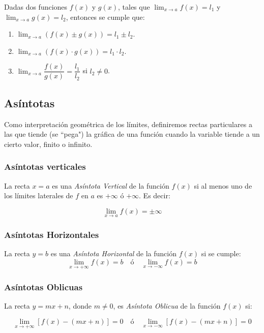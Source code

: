 Dadas dos funciones $f(x)$ y $g(x)$, tales que $\lim_{x\rightarrow
a}f(x)=l_1$ y $\lim_{x\rightarrow a}g(x)=l_2$, entonces se cumple
que:
\begin{enumerate}
\item $\displaystyle \lim_{x\rightarrow a}(f(x)\pm g(x))=l_1\pm l_2$.
\item $\displaystyle \lim_{x\rightarrow a}(f(x)\cdot g(x))=l_1\cdot l_2$.
\item $\displaystyle \lim_{x\rightarrow a}\dfrac{f(x)}{g(x)}=\dfrac{l_1}{l_2}$ si $l_2\neq 0$.
\end{enumerate}

\subsection{Asíntotas}
Como interpretación geométrica de los límites, definiremos rectas
particulares a las que tiende (se ``pega") la gráfica de una función
cuando la variable tiende a un cierto valor, finito o infinito.
\subsubsection*{Asíntotas verticales}
La recta $x=a$ es una \emph{Asíntota Vertical} de la función $f(x)$
si al menos uno de los límites laterales de $f$ en $a$ es $+\infty$
ó $+\infty$. Es decir:

\[
\mathop {\lim }\limits_{x \to a} f(x) =  \pm \infty
\]

\subsubsection*{Asíntotas Horizontales}
La recta $y=b$ es una \emph{Asíntota Horizontal} de la función
$f(x)$ si se cumple:
\[
\mathop {\lim }\limits_{x \to  + \infty } f(x) = b\quad
\text{ó}\quad\mathop {\lim }\limits_{x \to  - \infty } f(x) = b
\]


\subsubsection*{Asíntotas Oblicuas}

La recta $y=mx+n$, donde $m\neq0$, es \emph{Asíntota Oblicua} de la
función $f(x)$ si:


\[
\mathop {\lim }\limits_{x \to  + \infty } \left[ {f(x) - \left( {mx
+ n} \right)} \right] = 0\quad\text{ó}\quad\mathop {\lim }\limits_{x
\to - \infty } \left[ {f(x) - \left( {mx + n} \right)} \right] = 0
\]


